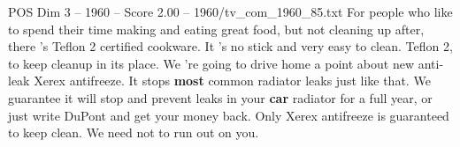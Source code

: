 \begin{textsample}{POS Dim 3 – 1960 – Score 2.00 – 1960/tv\_com\_1960\_85.txt}  \label{ex:f3_pos_030}
For people who like to spend their time making and eating great food, but not cleaning up after, there 's Teflon 2 certified cookware.
It 's no stick and very easy to clean.
Teflon 2, to keep cleanup in its place.
We 're going to drive home a point about new anti-leak Xerex antifreeze.
It stops \textbf{most} common radiator leaks just like that.
We guarantee it will stop and prevent leaks in your \textbf{car} radiator for a full year, or just write DuPont and get your money back.
Only Xerex antifreeze is guaranteed to keep clean.
We need not to run out on you.

\end{textsample}
